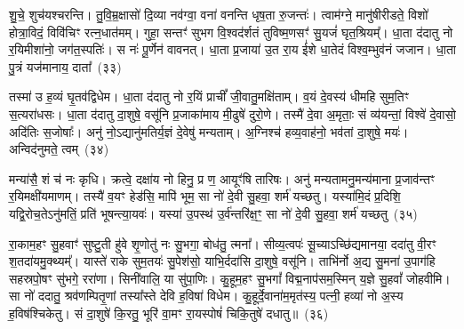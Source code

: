 शु॒चे॒ शुच॑यश्चरन्ति। तु॒वि॒म्र॒क्षासो॑ दि॒व्या नव॑ग्वा॒ वना॑ वनन्ति धृष॒ता रु॒जन्तः॑। त्वाम॑ग्ने॒ मानु॑षीरीडते॒ विशो॑ होत्रा॒विदं॒ विवि॑चिꣳ रत्न॒धात॑मम्। गुहा॒ सन्तꣳ॑ सुभग वि॒श्वद॑र्शतं तुविष्म॒णसꣳ॑ सु॒यजं॑ घृत॒श्रियम्᳚। धा॒ता द॑दातु नो र॒यिमीशा॑नो॒ जग॑त॒स्पतिः॑। स नः॑ पू॒र्णेन॑ वावनत्। धा॒ता प्र॒जाया॑ उ॒त रा॒य ई॑शे धा॒तेदं विश्व॒म्भुव॑नं जजान। धा॒ता पु॒त्रं यज॑मानाय॒ दाता᳚~(३३)

तस्मा॑ उ ह॒व्यं घृ॒तव॑द्विधेम। धा॒ता द॑दातु नो र॒यिं प्राचीं᳚ जी॒वातु॒मक्षि॑ताम्। व॒यं दे॒वस्य॑ धीमहि सुम॒तिꣳ स॒त्यरा॑धसः। धा॒ता द॑दातु दा॒शुषे॒ वसू॑नि प्र॒जाका॑माय मी॒ढुषे॑ दुरो॒णे। तस्मै॑ दे॒वा अ॒मृताः॒ सं व्य॑यन्तां॒ विश्वे॑ दे॒वासो॒ अदि॑तिः स॒जोषाः᳚। अनु॑ नो॒\-ऽद्यानु॑मतिर्य॒ज्ञं दे॒वेषु॑ मन्यताम्। अ॒ग्निश्च॑ हव्य॒वाह॑नो॒ भव॑तां दा॒शुषे॒ मयः॑। अन्विद॑नुमते॒ त्वम्~(३४)

मन्या॑सै॒ शं च॑ नः कृधि। क्रत्वे॒ दक्षा॑य नो हिनु॒ प्र ण॒ आयूꣳ॑षि तारिषः। अनु॑ मन्यतामनु॒मन्य॑माना प्र॒जाव॑न्तꣳ र॒यिमक्षी॑यमाणम्। तस्यै॑ व॒यꣳ हेड॑सि॒ मापि॑ भूम॒ सा नो॑ दे॒वी सु॒हवा॒ शर्म॑ यच्छतु। यस्या॑मि॒दं प्र॒दिशि॒ यद्वि॒रोच॒ते\-ऽनु॑मतिं॒ प्रति॑ भूषन्त्या॒यवः॑। यस्या॑ उ॒पस्थ॑ उ॒र्व॑न्तरि॑क्ष॒ꣳ॒ सा नो॑ दे॒वी सु॒हवा॒ शर्म॑ यच्छतु~(३५)

रा॒काम॒हꣳ सु॒हवाꣳ॑ सुष्टु॒ती हु॑वे शृ॒णोतु॑ नः सु॒भगा॒ बोध॑तु॒ त्मना᳚। सीव्य॒त्वपः॑ सू॒च्या\-ऽच्छि॑द्यमानया॒ ददा॑तु वी॒रꣳ श॒तदा॑यमु॒क्थ्यम्᳚। यास्ते॑ राके सुम॒तयः॑ सु॒पेश॑सो॒ याभि॒र्ददा॑सि दा॒शुषे॒ वसू॑नि। ताभि॑र्नो अ॒द्य सु॒मना॑ उ॒पाग॑हि सहस्रपो॒षꣳ सु॑भगे॒ ररा॑णा। सिनी॑वालि॒ या सु॑पा॒णिः। कु॒हूम॒हꣳ सु॒भगां᳚ विद्म॒नाप॑सम॒स्मिन् य॒ज्ञे सु॒हवां᳚ जोहवीमि। सा नो॑ ददातु॒ श्रव॑णम्पितृ॒णां तस्या᳚स्ते देवि ह॒विषा॑ विधेम। कु॒हूर्दे॒वाना॑म॒मृत॑स्य॒ पत्नी॒ हव्या॑ नो अ॒स्य ह॒विष॑श्चिकेतु। सं दा॒शुषे॑ कि॒रतु॒ भूरि॑ वा॒मꣳ रा॒यस्पोषं॑ चिकि॒तुषे॑ दधातु॥~(३६)

{\anuvakamend[{भामा॑सो॒ दाता॒ त्वम॒न्तरि॑क्ष॒ꣳ॒ सा नो॑ दे॒वी सु॒हवा॒ शर्म॑ यच्छतु॒ श्रव॑णं॒ चतु॑र्विꣳशतिश्च}]}%


{\anuvakamend[{वि वा ए॒तस्या वा॑यो इ॒मे वै चि॒त्तञ्चा॒ग्निर्भू॒तानां᳚ दे॒वा वा अ॑भ्याता॒नानृ॑ता॒षाड्रा॒ष्ट्रका॑माय॒ देवि॑का॒ वास्तो᳚ष्पते॒ त्वम॑ग्ने बृ॒हदेका॑\-दश}]}%
{}

